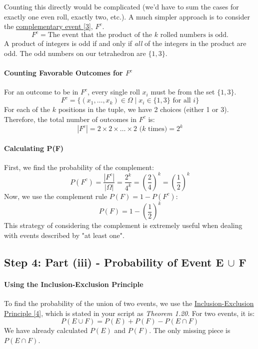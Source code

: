 \documentclass[11pt,a4paper]{article}
\begin{document}
Counting this directly would be complicated (we'd have to sum the cases for exactly one even roll, exactly two, etc.). A much simpler approach is to consider the \hyperlink{concept:complement}{complementary event [3]}, $F^c$.
\[
F^c = \text{The event that the product of the } k \text{ rolled numbers is odd.}
\]
A product of integers is odd if and only if \textit{all} of the integers in the product are odd. The odd numbers on our tetrahedron are $\{1, 3\}$.

\paragraph{Counting Favorable Outcomes for $F^c$}
For an outcome to be in $F^c$, every single roll $x_i$ must be from the set $\{1, 3\}$.
\[
F^c = \{ (x_1, \dots, x_k) \in \Omega \mid x_i \in \{1, 3\} \text{ for all } i \}
\]
For each of the $k$ positions in the tuple, we have 2 choices (either 1 or 3). Therefore, the total number of outcomes in $F^c$ is:
\[
|F^c| = 2 \times 2 \times \dots \times 2 \text{ ($k$ times)} = 2^k
\]
\paragraph{Calculating P(F)}
First, we find the probability of the complement:
\[
P(F^c) = \frac{|F^c|}{|\Omega|} = \frac{2^k}{4^k} = \left(\frac{2}{4}\right)^k = \left(\frac{1}{2}\right)^k
\]
Now, we use the complement rule $P(F) = 1 - P(F^c)$:
\[
P(F) = 1 - \left(\frac{1}{2}\right)^k
\]
This strategy of considering the complement is extremely useful when dealing with events described by "at least one".

\subsection{Step 4: Part (iii) - Probability of Event E $\cup$ F}

\paragraph{Using the Inclusion-Exclusion Principle}
To find the probability of the union of two events, we use the \hyperlink{concept:inclusionexclusion}{Inclusion-Exclusion Principle [4]}, which is stated in your script as \textit{Theorem 1.20}. For two events, it is:
\[
P(E \cup F) = P(E) + P(F) - P(E \cap F)
\]
We have already calculated $P(E)$ and $P(F)$. The only missing piece is $P(E \cap F)$.
\end{document}
